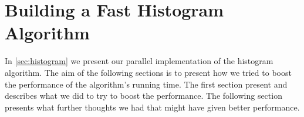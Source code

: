 \chapter{Building a Fast Histogram Algorithm}
\label{chap:fast histo}

In \cref{sec:histogram} we present our parallel implementation of the histogram algorithm.
The aim of the following sections is to present how we tried to boost the performance of the algorithm's running time.
The first section present and describes what we did to try to boost the performance.
The following section presents what further thoughts we had that might have given better performance.


